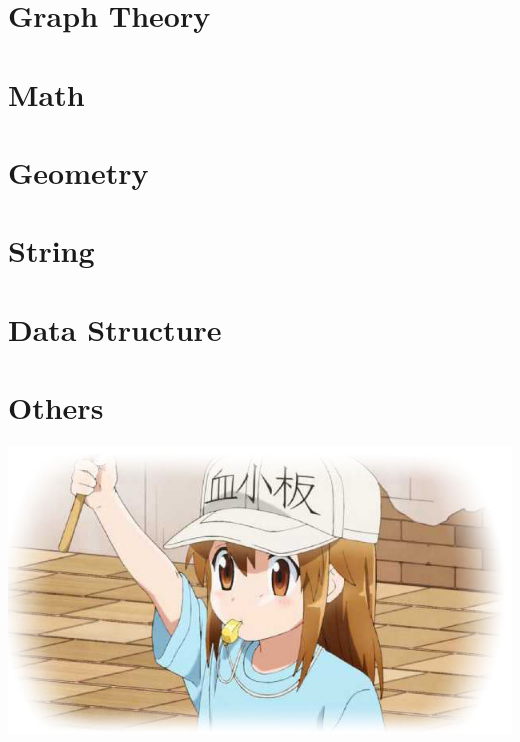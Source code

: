 \documentclass[titlepage, openany]{book}
\newcommand{\mychapter}[2]{
    \chapter{#1}
    
}
\begin{document}
    \mychapter{Graph Theory}{graph_theory.tex}
    \mychapter{Math}{math.tex}
    \mychapter{Geometry}{geometry.tex}
    \mychapter{String}{string.tex}
    \mychapter{Data Structure}{data_structure.tex}
    \mychapter{Others}{others.tex}
    \vfill
    \centerline{\includegraphics[scale=0.2]{Platelet.jpg}}
    \vfill
\end{document}
